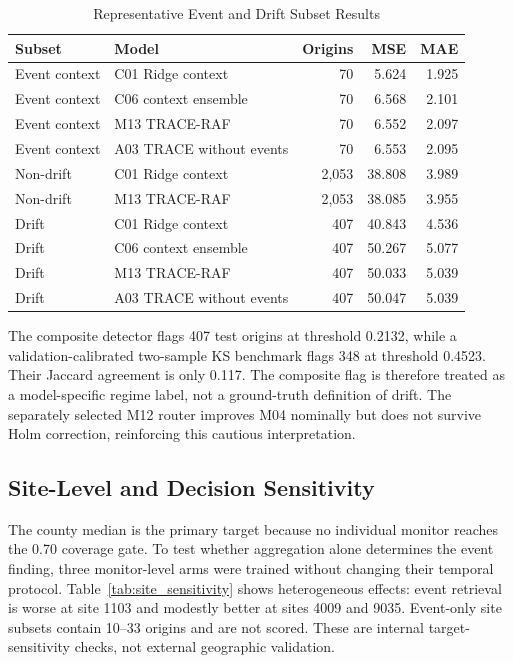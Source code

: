 \documentclass{ieeeaccess}
\begin{document}
\begin{table}[!t]
\centering
\caption{Representative Event and Drift Subset Results}
\label{tab:event_drift_results}
\begin{tabular}{llrrr}
\toprule
Subset & Model & Origins & MSE & MAE \\
\midrule
Event context & C01 Ridge context & 70 & 5.624 & 1.925 \\
Event context & C06 context ensemble & 70 & 6.568 & 2.101 \\
Event context & M13 TRACE-RAF & 70 & 6.552 & 2.097 \\
Event context & A03 TRACE without events & 70 & 6.553 & 2.095 \\
Non-drift & C01 Ridge context & 2,053 & 38.808 & 3.989 \\
Non-drift & M13 TRACE-RAF & 2,053 & 38.085 & 3.955 \\
Drift & C01 Ridge context & 407 & 40.843 & 4.536 \\
Drift & C06 context ensemble & 407 & 50.267 & 5.077 \\
Drift & M13 TRACE-RAF & 407 & 50.033 & 5.039 \\
Drift & A03 TRACE without events & 407 & 50.047 & 5.039 \\
\bottomrule
\end{tabular}
\end{table}

The composite detector flags 407 test origins at threshold 0.2132, while a
validation-calibrated two-sample KS benchmark flags 348 at threshold 0.4523.
Their Jaccard agreement is only 0.117. The composite flag is therefore treated
as a model-specific regime label, not a ground-truth definition of drift. The
separately selected M12 router improves M04 nominally but does not survive Holm
correction, reinforcing this cautious interpretation.

\subsection{Site-Level and Decision Sensitivity}
The county median is the primary target because no individual monitor reaches
the 0.70 coverage gate. To test whether aggregation alone determines the event
finding, three monitor-level arms were trained without changing their temporal
protocol. Table~\ref{tab:site_sensitivity} shows heterogeneous effects: event
retrieval is worse at site 1103 and modestly better at sites 4009 and 9035.
Event-only site subsets contain 10--33 origins and are not scored. These are
internal target-sensitivity checks, not external geographic validation.
\end{document}
